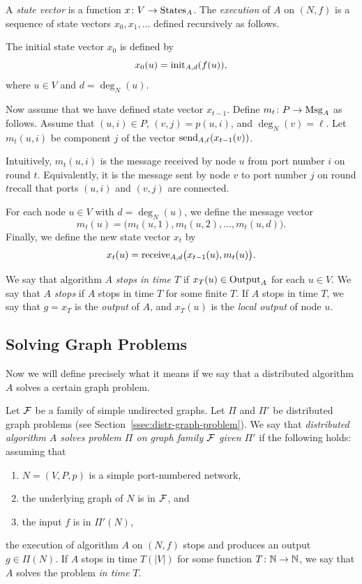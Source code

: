 A \emph{state vector} is a function $x\colon V \to \operatorname{States}_A$. The \emph{execution} of $A$ on $(N,f)$ is a sequence of state vectors $x_0, x_1, \dotsc$ defined recursively as follows.

The initial state vector $x_0$ is defined by
\[
    x_0(u) = \operatorname{init}_{A,d}(f(u)),
\]
where $u \in V$ and $d = \deg_N(u)$.

Now assume that we have defined state vector $x_{t-1}$. Define $m_t \colon P \to \operatorname{Msg}_A$ as follows. Assume that $(u,i) \in P$, $(v,j) = p(u,i)$, and $\deg_N(v) = \ell$. Let $m_t(u,i)$ be component $j$ of the vector $\operatorname{send}_{A,\ell}(x_{t-1}(v))$.

Intuitively, $m_t(u,i)$ is the message received by node $u$ from port number $i$ on round $t$. Equivalently, it is the message sent by node $v$ to port number $j$ on round $t$\mydash recall that ports $(u,i)$ and $(v,j)$ are connected.

For each node $u \in V$ with $d = \deg_N(u)$, we define the message vector
\[
    m_t(u) = \bigl(m_t(u,1), m_t(u,2), \dotsc, m_t(u,d) \bigr).
\]
Finally, we define the new state vector $x_t$ by
\[
    x_t(u) = \operatorname{receive}_{A,d}\bigl(x_{t-1}(u), m_t(u) \bigr).
\]

We say that algorithm $A$ \emph{stops in time $T$} if $x_T(u) \in \operatorname{Output}_A$ for each $u \in V$. We say that $A$ \emph{stops} if $A$ stops in time $T$ for some finite $T$. If $A$ stops in time $T$, we say that $g = x_T$ is the \emph{output} of $A$, and $x_T(u)$ is the \emph{local output} of node $u$.

\subsection{Solving Graph Problems}

Now we will define precisely what it means if we say that a distributed algorithm $A$ solves a certain graph problem.

Let $\mathcal{F}$ be a family of simple undirected graphs. Let $\Pi$ and $\Pi'$ be distributed graph problems (see Section~\ref{ssec:distr-graph-problem}). We say that \emph{distributed algorithm $A$ solves problem $\Pi$ on graph family $\mathcal{F}$ given $\Pi'$} if the following holds: assuming that
\begin{enumerate}[noitemsep]
    \item $N = (V,P,p)$ is a simple port-numbered network,
    \item the underlying graph of $N$ is in $\mathcal{F}$, and
    \item the input $f$ is in $\Pi'(N)$,
\end{enumerate}
the execution of algorithm $A$ on $(N,f)$ stops and produces an output $g \in \Pi(N)$. If $A$ stops in time $T(|V|)$ for some function $T\colon \mathbb{N} \to \mathbb{N}$, we say that $A$ solves the problem \emph{in time $T$}.


